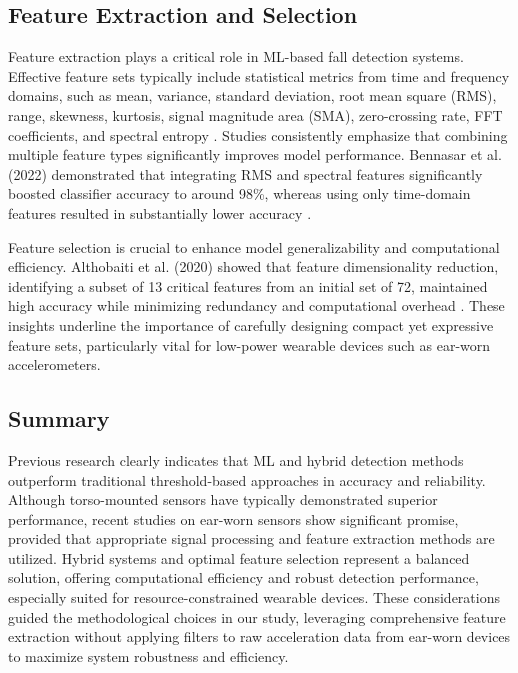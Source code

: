 \documentclass[conference]{IEEEtran}
\begin{document}
\subsection{Feature Extraction and Selection}

Feature extraction plays a critical role in ML-based fall detection systems. Effective feature sets typically include statistical metrics from time and frequency domains, such as mean, variance, standard deviation, root mean square (RMS), range, skewness, kurtosis, signal magnitude area (SMA), zero-crossing rate, FFT coefficients, and spectral entropy \cite{11,12,13}. Studies consistently emphasize that combining multiple feature types significantly improves model performance. Bennasar et al. (2022) demonstrated that integrating RMS and spectral features significantly boosted classifier accuracy to around 98\%, whereas using only time-domain features resulted in substantially lower accuracy \cite{13}.

Feature selection is crucial to enhance model generalizability and computational efficiency. Althobaiti et al. (2020) showed that feature dimensionality reduction, identifying a subset of 13 critical features from an initial set of 72, maintained high accuracy while minimizing redundancy and computational overhead \cite{7}. These insights underline the importance of carefully designing compact yet expressive feature sets, particularly vital for low-power wearable devices such as ear-worn accelerometers.

\subsection{Summary}

Previous research clearly indicates that ML and hybrid detection methods outperform traditional threshold-based approaches in accuracy and reliability. Although torso-mounted sensors have typically demonstrated superior performance, recent studies on ear-worn sensors show significant promise, provided that appropriate signal processing and feature extraction methods are utilized. Hybrid systems and optimal feature selection represent a balanced solution, offering computational efficiency and robust detection performance, especially suited for resource-constrained wearable devices. These considerations guided the methodological choices in our study, leveraging comprehensive feature extraction without applying filters to raw acceleration data from ear-worn devices to maximize system robustness and efficiency.
\end{document}
